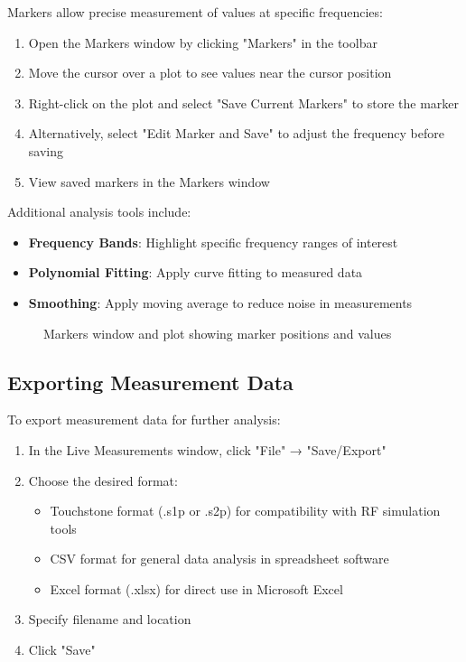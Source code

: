 \documentclass[12pt,a4paper]{article}
\begin{document}
Markers allow precise measurement of values at specific frequencies:

\begin{enumerate}
    \item Open the Markers window by clicking "Markers" in the toolbar
    \item Move the cursor over a plot to see values near the cursor position
    \item Right-click on the plot and select "Save Current Markers" to store the marker
    \item Alternatively, select "Edit Marker and Save" to adjust the frequency before saving
    \item View saved markers in the Markers window
\end{enumerate}

Additional analysis tools include:
\begin{itemize}
    \item \textbf{Frequency Bands}: Highlight specific frequency ranges of interest
    \item \textbf{Polynomial Fitting}: Apply curve fitting to measured data
    \item \textbf{Smoothing}: Apply moving average to reduce noise in measurements
\end{itemize}

\begin{figure}[H]
    \centering
    \caption{Markers window and plot showing marker positions and values}
    \label{fig:markers}
\end{figure}

\subsection{Exporting Measurement Data}

To export measurement data for further analysis:

\begin{enumerate}
    \item In the Live Measurements window, click "File" → "Save/Export"
    \item Choose the desired format:
    \begin{itemize}
        \item Touchstone format (.s1p or .s2p) for compatibility with RF simulation tools
        \item CSV format for general data analysis in spreadsheet software
        \item Excel format (.xlsx) for direct use in Microsoft Excel
    \end{itemize}
    \item Specify filename and location
    \item Click "Save"
\end{enumerate}
\end{document}

